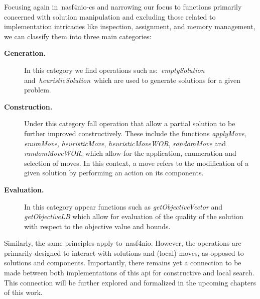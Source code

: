 Focusing again in~\acrshort{nasf4nio-cs} and narrowing our focus to functions
primarily concerned with solution manipulation and excluding those related to
implementation intricacies like inspection, assignment, and memory management,
we can classify them into three main categories:

\begin{description}
      \item[\textbf{Generation.}] In this category we find operations such
            as:~\textit{emptySolution} and~\textit{heuristicSolution}~which are used to
            generate solutions for a given problem.
      \item[\textbf{Construction.}] Under this category fall operation that
            allow a partial solution to be further improved constructively. These include
            the functions \textit{applyMove}, \textit{enumMove}, \textit{heuristicMove},
            \textit{heuristicMoveWOR}, \textit{randomMove} and \textit{randomMoveWOR},
            which allow for the application, enumeration and selection of moves.
            In this context, a move refers to the modification of a given solution by
            performing an action on its components.
      \item[\textbf{Evaluation.}] In this category appear functions such as
            \textit{getObjectiveVector} and \textit{getObjectiveLB} which allow for
            evaluation of the quality of the solution with respect to the objective
            value and bounds.
\end{description}

Similarly, the same principles apply to~\acrshort{nasf4nio}. However, the
operations are primarily designed to interact with solutions and (local) moves,
as opposed to solutions and components. Importantly, there remains yet a
connection to be made between both implementations of this \acrshort{api} for
constructive and local search. This connection will be further explored and
formalized in the upcoming chapters of this work.